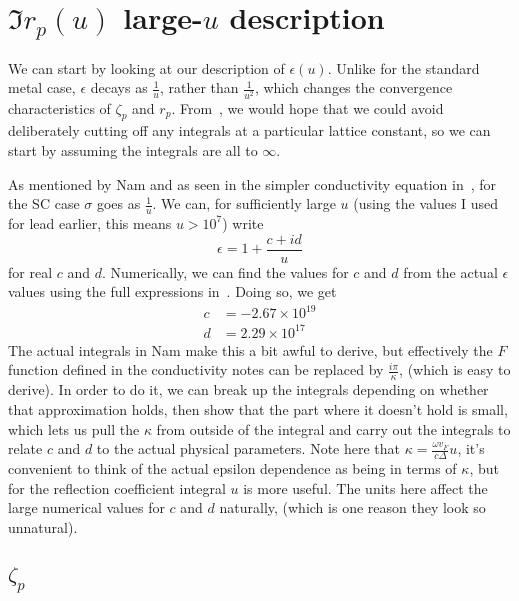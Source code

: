 \documentclass[11pt]{article}
\begin{document}
	\section{$\Im r_p(u)$ large-$u$ description} \label{sec:imrpasymptotic}

	We can start by looking at our description of $\epsilon(u)$.
	Unlike for the standard metal case, $\epsilon$ decays as $\frac{1}{u}$, rather than $\frac{1}{u^2}$, which changes the convergence characteristics of $\zeta_p$ and $r_p$.
	From~\cite{Churchill2016}, we would hope that we could avoid deliberately cutting off any integrals at a particular lattice constant, so we can start by assuming the integrals are all to $\infty$.

	As mentioned by Nam\cite{Nam1967} and as seen in the simpler conductivity equation in~\cite{AGD}, for the SC case $\sigma$ goes as $\frac1u$.
	We can, for sufficiently large $u$ (using the values I used for lead earlier, this means $u > 10^7$) write
	\begin{equation}
		\epsilon = 1 + \frac{c + i d}{u} \label{eq:epsansatz}
	\end{equation}
	for real $c$ and $d$.
	Numerically, we can find the values for $c$ and $d$ from the actual $\epsilon$ values using the full expressions in~\cite{Nam1967}.
	Doing so, we get
	\begin{align}
		c &= -2.67 \times 10^{19} \\
		d &= 2.29 \times 10^{17}
	\end{align}
	The actual integrals in Nam make this a bit awful to derive, but effectively the $F$ function defined in the conductivity notes can be replaced by $\frac{i \pi}{\kappa}$, (which is easy to derive).
	In order to do it, we can break up the integrals depending on whether that approximation holds, then show that the part where it doesn't hold is small, which lets us pull the $\kappa$ from outside of the integral and carry out the integrals to relate $c$ and $d$ to the actual physical parameters.
	Note here that $\kappa = \frac{\omega v_F}{c \Delta} u$, it's convenient to think of the actual epsilon dependence as being in terms of $\kappa$, but for the reflection coefficient integral $u$ is more useful.
	The units here affect the large numerical values for $c$ and $d$ naturally, (which is one reason they look so unnatural).

	\subsection{$\zeta_p$} \label{subsec:zetap}
\end{document}
